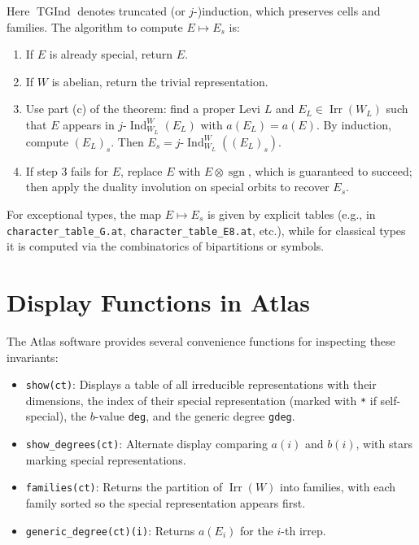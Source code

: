 \documentclass[12pt]{amsart}
\newcommand{\Ind}{\operatorname{Ind}}
\newcommand{\sgn}{\operatorname{sgn}}
\newcommand{\Irr}{\operatorname{Irr}}
\newcommand{\TInd}{\operatorname{TGInd}}
\begin{document}
Here $\TInd$ denotes truncated (or $j$-)induction, which preserves cells and
families.  The algorithm to compute $E \mapsto E_s$ is:
\begin{enumerate}
  \item If $E$ is already special, return $E$.
  \item If $W$ is abelian, return the trivial representation.
  \item Use part (c) of the theorem: find a proper Levi $L$ and $E_L \in
        \Irr(W_L)$ such that $E$ appears in $j\text{-}\!\Ind_{W_L}^W(E_L)$
        with $a(E_L) = a(E)$.  By induction, compute $(E_L)_s$.  Then
        $E_s = j\text{-}\!\Ind_{W_L}^W((E_L)_s)$.
  \item If step 3 fails for $E$, replace $E$ with $E \otimes \sgn$, which is
        guaranteed to succeed; then apply the duality involution on special
        orbits to recover $E_s$.
\end{enumerate}

For exceptional types, the map $E \mapsto E_s$ is given by explicit tables
(e.g., in \texttt{character\_table\_G.at}, \texttt{character\_table\_E8.at},
etc.), while for classical types it is computed via the combinatorics of
bipartitions or symbols.

\section{Display Functions in Atlas}

The Atlas software provides several convenience functions for inspecting these
invariants:

\begin{itemize}
  \item \texttt{show(ct)}: Displays a table of all irreducible representations
        with their dimensions, the index of their special representation
        (marked with \texttt{*} if self-special), the $b$-value \texttt{deg},
        and the generic degree \texttt{gdeg}.
  \item \texttt{show\_degrees(ct)}: Alternate display comparing $a(i)$ and
        $b(i)$, with stars marking special representations.
  \item \texttt{families(ct)}: Returns the partition of $\Irr(W)$ into
        families, with each family sorted so the special representation appears
        first.
  \item \texttt{generic\_degree(ct)(i)}: Returns $a(E_i)$ for the $i$-th
        irrep.
\end{itemize}
\end{document}
